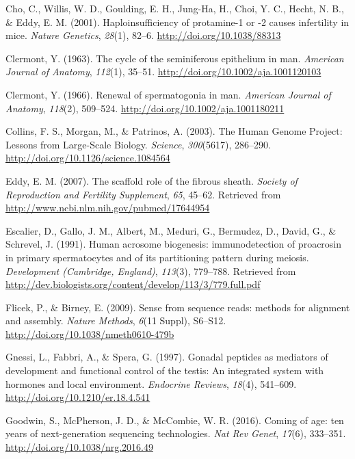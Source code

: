 \documentclass[12pt,twoside]{reedthesis}
\theoremstyle{definition}
\theoremstyle{definition}
\theoremstyle{remark}
\begin{document}
  \hypertarget{ref-Cho2001}{}
  Cho, C., Willis, W. D., Goulding, E. H., Jung-Ha, H., Choi, Y. C.,
  Hecht, N. B., \& Eddy, E. M. (2001). Haploinsufficiency of protamine-1
  or -2 causes infertility in mice. \emph{Nature Genetics}, \emph{28}(1),
  82--6. \url{http://doi.org/10.1038/88313}
  
  \hypertarget{ref-Clermont1963}{}
  Clermont, Y. (1963). The cycle of the seminiferous epithelium in man.
  \emph{American Journal of Anatomy}, \emph{112}(1), 35--51.
  \url{http://doi.org/10.1002/aja.1001120103}
  
  \hypertarget{ref-Clermont1966}{}
  Clermont, Y. (1966). Renewal of spermatogonia in man. \emph{American
  Journal of Anatomy}, \emph{118}(2), 509--524.
  \url{http://doi.org/10.1002/aja.1001180211}
  
  \hypertarget{ref-Collins2003}{}
  Collins, F. S., Morgan, M., \& Patrinos, A. (2003). The Human Genome
  Project: Lessons from Large-Scale Biology. \emph{Science},
  \emph{300}(5617), 286--290. \url{http://doi.org/10.1126/science.1084564}
  
  \hypertarget{ref-Eddy2007}{}
  Eddy, E. M. (2007). The scaffold role of the fibrous sheath.
  \emph{Society of Reproduction and Fertility Supplement}, \emph{65},
  45--62. Retrieved from \url{http://www.ncbi.nlm.nih.gov/pubmed/17644954}
  
  \hypertarget{ref-Escalier1991}{}
  Escalier, D., Gallo, J. M., Albert, M., Meduri, G., Bermudez, D., David,
  G., \& Schrevel, J. (1991). Human acrosome biogenesis: immunodetection
  of proacrosin in primary spermatocytes and of its partitioning pattern
  during meiosis. \emph{Development (Cambridge, England)}, \emph{113}(3),
  779--788. Retrieved from
  \url{http://dev.biologists.org/content/develop/113/3/779.full.pdf}
  
  \hypertarget{ref-Flicek2009}{}
  Flicek, P., \& Birney, E. (2009). Sense from sequence reads: methods for
  alignment and assembly. \emph{Nature Methods}, \emph{6}(11 Suppl),
  S6--S12. \url{http://doi.org/10.1038/nmeth0610-479b}
  
  \hypertarget{ref-Gnessi1997}{}
  Gnessi, L., Fabbri, A., \& Spera, G. (1997). Gonadal peptides as
  mediators of development and functional control of the testis: An
  integrated system with hormones and local environment. \emph{Endocrine
  Reviews}, \emph{18}(4), 541--609.
  \url{http://doi.org/10.1210/er.18.4.541}
  
  \hypertarget{ref-Goodwin2016}{}
  Goodwin, S., McPherson, J. D., \& McCombie, W. R. (2016). Coming of age:
  ten years of next-generation sequencing technologies. \emph{Nat Rev
  Genet}, \emph{17}(6), 333--351. \url{http://doi.org/10.1038/nrg.2016.49}
  
\end{document}
